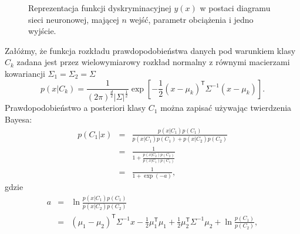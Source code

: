 \documentclass[11pt]{book}
\theoremstyle{definition}
\begin{document}
\begin{SCfigure}
	\centering
	
	\caption{ Reprezentacja funkcji dyskryminacyjnej $y(x)$ w postaci diagramu sieci neuronowej, mającej $n$ wejść, parametr obciążenia i jedno wyjście.  }
\end{SCfigure}
%
\noindent Załóżmy, że funkcja rozkładu prawdopodobieństwa danych pod warunkiem klasy $C_k$ zadana jest przez wielowymiarowy rozkład normalny z równymi macierzami kowariancji $ \Sigma_1 = \Sigma_2 = \Sigma$
%
\begin{equation}
p(x|C_k) = \frac{1}{\left(2 \pi\right)^{\frac{d}{2}} \left| \Sigma \right|^{\frac{1}{2}}} \exp \left[ -\frac{1}{2} \left(x - \mu_k\right)^\mathsf{T} \Sigma^{-1} \left(x - \mu_k \right) \right].
\end{equation}
%
Prawdopodobieństwo a posteriori klasy $C_1$ można zapisać używając twierdzenia Bayesa:
%
\begin{eqnarray}
p(C_1 | x) &=& \frac{p(x|C_1) p(C_1)}{ p(x|C_1) p(C_1) + p(x|C_2)p(C_2)} \nonumber\\
&=& \frac{1}{1 + \frac{p(x|C_2)p(C_2)}{p(x|C_1)p(C_1)}} \nonumber\\ 
&=& \frac{1}{1 + \exp(-a)},
\end{eqnarray}
%
gdzie
%
\begin{eqnarray}
a &=& \ln \frac{p(x|C_1)p(C_1)}{p(x|C_2)p(C_2)} \nonumber \\
&=& \left( \mu_1 - \mu_2 \right)^{\mathsf{T}} \Sigma^{-1} x - \frac{1}{2} \mu_1^\mathsf{T}\mu_1 + \frac{1}{2} \mu_2^\mathsf{T} \Sigma^{-1} \mu_2 + \ln \frac{p(C_1)}{p(C_2)},
\end{eqnarray}
\end{document}
